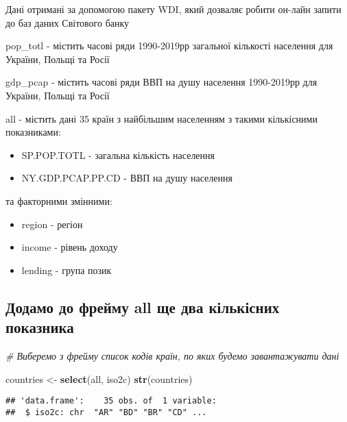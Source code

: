 \documentclass[
]{article}
\newenvironment{Shaded}{\begin{snugshade}}{\end{snugshade}}
\newcommand{\CommentTok}[1]{\textcolor[rgb]{0.56,0.35,0.01}{\textit{#1}}}
\newcommand{\KeywordTok}[1]{\textcolor[rgb]{0.13,0.29,0.53}{\textbf{#1}}}
\newcommand{\NormalTok}[1]{#1}
\newcommand{\StringTok}[1]{\textcolor[rgb]{0.31,0.60,0.02}{#1}}
\providecommand{\tightlist}{%
  \setlength{\itemsep}{0pt}\setlength{\parskip}{0pt}}
\begin{document}
Дані отримані за допомогою пакету WDI, який дозваляє робити он-лайн
запити до баз даних Світового банку

pop\_totl - містить часові ряди 1990-2019рр загальної кількості
населення для України, Польщі та Росії

gdp\_pcap - містить часові ряди ВВП на душу населення 1990-2019рр для
України, Польщі та Росії

all - містить дані 35 країн з найбільшим населенням з такими кількісними
показниками:

\begin{itemize}
\tightlist
\item
  SP.POP.TOTL - загальна кількість населення
\item
  NY.GDP.PCAP.PP.CD - ВВП на душу населення
\end{itemize}

та факторними змінними:

\begin{itemize}
\tightlist
\item
  region - регіон
\item
  income - рівень доходу
\item
  lending - група позик
\end{itemize}

\hypertarget{ux434ux43eux434ux430ux43cux43e-ux434ux43e-ux444ux440ux435ux439ux43cux443-all-ux449ux435-ux434ux432ux430-ux43aux456ux43bux44cux43aux456ux441ux43dux438ux445-ux43fux43eux43aux430ux437ux43dux438ux43aux430}{%
\subsection{Додамо до фрейму all ще два кількісних
показника}\label{ux434ux43eux434ux430ux43cux43e-ux434ux43e-ux444ux440ux435ux439ux43cux443-all-ux449ux435-ux434ux432ux430-ux43aux456ux43bux44cux43aux456ux441ux43dux438ux445-ux43fux43eux43aux430ux437ux43dux438ux43aux430}}

\begin{Shaded}
\begin{Highlighting}[]
\CommentTok{# Виберемо з фрейму список кодів країн, по яких будемо завантажувати дані}

\NormalTok{countries <-}\StringTok{ }\KeywordTok{select}\NormalTok{(all, iso2c)}
\KeywordTok{str}\NormalTok{(countries)}
\end{Highlighting}
\end{Shaded}

\begin{verbatim}
## 'data.frame':    35 obs. of  1 variable:
##  $ iso2c: chr  "AR" "BD" "BR" "CD" ...
\end{verbatim}
\end{document}
